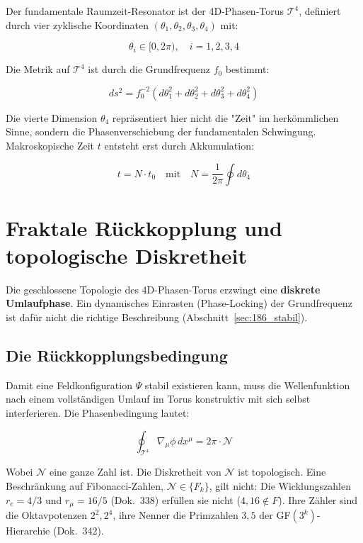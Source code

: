 	Der fundamentale Raumzeit-Resonator ist der 4D-Phasen-Torus $\mathcal{T}^4$, definiert durch vier zyklische Koordinaten $(\theta_1, \theta_2, \theta_3, \theta_4)$ mit:
	
	\begin{equation}
		\theta_i \in [0, 2\pi),\quad i=1,2,3,4
	\end{equation}
	
	Die Metrik auf $\mathcal{T}^4$ ist durch die Grundfrequenz $f_0$ bestimmt:
	
	\begin{equation}
		ds^2 = f_0^{-2} \left( d\theta_1^2 + d\theta_2^2 + d\theta_3^2 + d\theta_4^2 \right)
	\end{equation}
	
	Die vierte Dimension $\theta_4$ repräsentiert hier nicht die "Zeit" im herkömmlichen Sinne, sondern die Phasenverschiebung der fundamentalen Schwingung. Makroskopische Zeit $t$ entsteht erst durch Akkumulation:
	
	\begin{equation}
		t = N \cdot t_0 \quad \text{mit} \quad N = \frac{1}{2\pi} \oint d\theta_4
	\end{equation}
	
	\section{Fraktale Rückkopplung und topologische Diskretheit}
	
	Die geschlossene Topologie des 4D-Phasen-Torus erzwingt eine \textbf{diskrete Umlaufphase}. Ein dynamisches Einrasten (Phase-Locking) der Grundfrequenz ist dafür nicht die richtige Beschreibung (Abschnitt~\ref{sec:186_stabil}).
	
	\subsection{Die Rückkopplungsbedingung}
	
	Damit eine Feldkonfiguration $\Psi$ stabil existieren kann, muss die Wellenfunktion nach einem vollständigen Umlauf im Torus konstruktiv mit sich selbst interferieren. Die Phasenbedingung lautet:
	
	\begin{equation}
		\oint_{\mathcal{T}^4} \nabla_{\mu} \phi \, dx^\mu = 2\pi \cdot \mathcal{N}
	\end{equation}
	
	Wobei $\mathcal{N}$ eine ganze Zahl ist. Die Diskretheit von $\mathcal{N}$ ist topologisch. Eine Beschränkung auf Fibonacci-Zahlen, $\mathcal{N} \in \{F_k\}$, gilt nicht: Die Wicklungszahlen $r_e = 4/3$ und $r_\mu = 16/5$ (Dok.~338) erfüllen sie nicht ($4, 16 \notin F$). Ihre Zähler sind die Oktavpotenzen $2^2, 2^4$, ihre Nenner die Primzahlen $3, 5$ der GF$(3^k)$-Hierarchie (Dok.~342).
	

